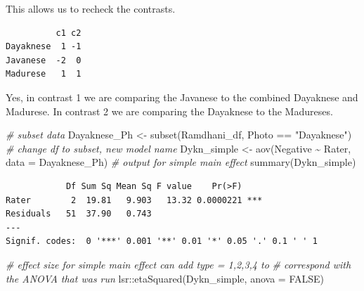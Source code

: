 \documentclass[
  11pt,
]{book}
\newenvironment{Shaded}{\begin{snugshade}}{\end{snugshade}}
\newcommand{\AttributeTok}[1]{\textcolor[rgb]{0.77,0.63,0.00}{#1}}
\newcommand{\CommentTok}[1]{\textcolor[rgb]{0.56,0.35,0.01}{\textit{#1}}}
\newcommand{\ConstantTok}[1]{\textcolor[rgb]{0.00,0.00,0.00}{#1}}
\newcommand{\FunctionTok}[1]{\textcolor[rgb]{0.00,0.00,0.00}{#1}}
\newcommand{\NormalTok}[1]{#1}
\newcommand{\OtherTok}[1]{\textcolor[rgb]{0.56,0.35,0.01}{#1}}
\newcommand{\SpecialCharTok}[1]{\textcolor[rgb]{0.00,0.00,0.00}{#1}}
\newcommand{\StringTok}[1]{\textcolor[rgb]{0.31,0.60,0.02}{#1}}
\begin{document}
This allows us to recheck the contrasts.

\begin{Shaded}
\end{Shaded}

\begin{verbatim}
          c1 c2
Dayaknese  1 -1
Javanese  -2  0
Madurese   1  1
\end{verbatim}

Yes, in contrast 1 we are comparing the Javanese to the combined Dayaknese and Madurese. In contrast 2 we are comparing the Dayaknese to the Madureses.

\begin{Shaded}
\begin{Highlighting}[]
\CommentTok{\# subset data}
\NormalTok{Dayaknese\_Ph }\OtherTok{\textless{}{-}} \FunctionTok{subset}\NormalTok{(Ramdhani\_df, Photo }\SpecialCharTok{==} \StringTok{"Dayaknese"}\NormalTok{)}
\CommentTok{\# change df to subset, new model name}
\NormalTok{Dykn\_simple }\OtherTok{\textless{}{-}} \FunctionTok{aov}\NormalTok{(Negative }\SpecialCharTok{\textasciitilde{}}\NormalTok{ Rater, }\AttributeTok{data =}\NormalTok{ Dayaknese\_Ph)}
\CommentTok{\# output for simple main effect}
\FunctionTok{summary}\NormalTok{(Dykn\_simple)}
\end{Highlighting}
\end{Shaded}

\begin{verbatim}
            Df Sum Sq Mean Sq F value    Pr(>F)    
Rater        2  19.81   9.903   13.32 0.0000221 ***
Residuals   51  37.90   0.743                      
---
Signif. codes:  0 '***' 0.001 '**' 0.01 '*' 0.05 '.' 0.1 ' ' 1
\end{verbatim}

\begin{Shaded}
\begin{Highlighting}[]
\CommentTok{\# effect size for simple main effect can add \textquotesingle{}type = 1,2,3,4\textquotesingle{} to}
\CommentTok{\# correspond with the ANOVA that was run}
\NormalTok{lsr}\SpecialCharTok{::}\FunctionTok{etaSquared}\NormalTok{(Dykn\_simple, }\AttributeTok{anova =} \ConstantTok{FALSE}\NormalTok{)}
\end{Highlighting}
\end{Shaded}
\end{document}
